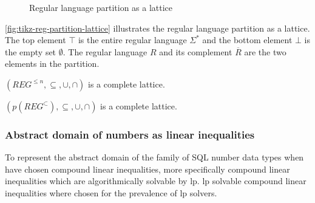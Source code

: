 \begin{figure}[!htb]
    \caption{Regular language partition as a lattice}
    \label{fig:tikz-reg-partition-lattice}
\end{figure}
\autoref{fig:tikz-reg-partition-lattice} illustrates the regular language partition as a lattice. The top element $\top$ is the entire regular language $\Sigma^*$ and the bottom element $\bot$ is the empty set $\emptyset$. The regular language $R$ and its complement $\overline{R}$ are the two elements in the partition.

\begin{theorem}\label{thm:finite-reg-lattice}
    $(REG^{\leq n}, \subseteq, \cup, \cap)$ is a complete lattice.
\end{theorem}

\begin{theorem}\label{thm:reg-partition-lattice}
    $(p(REG^\subset), \subseteq, \cup, \cap)$ is a complete lattice.
\end{theorem}


\subsubsection{Abstract domain of numbers as linear inequalities}\label{subsubsec:abstract_domains_numbers}


To represent the abstract domain of the family of SQL number data types when have chosen compound linear inequalities, more specifically compound linear inequalities which are algorithmically solvable by \gls{lp}.
\gls{lp} solvable compound linear inequalities where chosen for the prevalence of \gls{lp} solvers.

